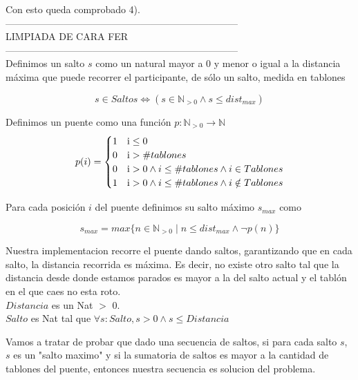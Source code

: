 Con esto queda comprobado 4).
\\

------------------------------------------------------------------------\\
LIMPIADA DE CARA FER\\
------------------------------------------------------------------------\\
Definimos un salto $s$ como un natural mayor a 0 y menor o igual a la distancia 
máxima que puede recorrer el participante, de sólo un salto, medida en tablones

\begin{displaymath}
	s \in Saltos \Leftrightarrow (s \in \mathbb{N}_{> 0} \land s \leq dist_{max})
\end{displaymath}

Definimos un puente como una función $p: \mathbb{N}_{>0} \to \mathbb{N}$ 
\begin{displaymath}
	p(i) = \begin{cases} 
					1 &\mbox i \leq 0 \\ 
					0 &\mbox i > \#tablones \\
					0 &\mbox i > 0 \land i \leq \#tablones \land i \in Tablones \\
					1 &\mbox i > 0 \land i \leq \#tablones \land i \notin Tablones \\
				\end{cases} %
\end{displaymath}

Para cada posición $i$ del puente definimos su salto máximo $s_{max}$ como 

\begin{displaymath}
	s_{max} = max \{n \in \mathbb{N}_{>0} \mid n \leq dist_{max} \land  \neg p(n)\}
\end{displaymath}

Nuestra implementacion recorre el puente dando saltos, garantizando que en cada salto, la distancia recorrida es m\'axima. Es decir, no existe otro salto tal que la distancia desde donde estamos parados es mayor a la del salto actual y el tabl\'on en el que caes no esta roto.\\
$Distancia$ es un Nat $>$ 0. \\
$Salto$ es Nat tal que $\forall s:Salto, s > 0 \wedge s \leq Distancia$
 
Vamos a tratar de probar que dado una secuencia de saltos, si para cada salto $s$, $s$ es un "salto maximo" y si la sumatoria de saltos es mayor a la cantidad de tablones del puente, entonces nuestra secuencia es solucion del problema.

